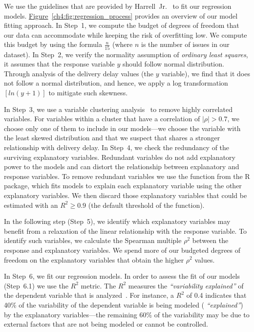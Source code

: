 We use the guidelines that are provided by
Harrell~Jr.~\cite{harrell2001regression} to fit our regression models.
\hyperref[ch4:fig:regression_process]{Figure}~\ref{ch4:fig:regression_process} provides
an overview of our model fitting approach. In Step~1, we compute the budget of
degrees of freedom that our data can accommodate while keeping the risk of
overfitting low. We compute this budget by using the formula $\frac{n}{15}$
(where $n$ is the number of issues in our dataset). In Step~2, we verify the
normality assumption of \textit{ordinary least squares}, \ie it assumes that the
response variable $y$ should follow normal distribution. Through analysis of the
delivery delay values (\ie the $y$ variable), we find that it does not follow
a normal distribution, and hence, we apply a log transformation $[ln(y+1)]$ to
mitigate such skewness.

In Step~3, we use a variable clustering analysis~\cite{sarle1990varclus} to
remove highly correlated variables. For variables within a cluster that have a
correlation of $|\rho|>0.7$, we choose only one of them to include in our
models---we choose the variable with the least skewed distribution and that we
suspect that shares a stronger relationship with delivery delay. In Step~4, we
check the redundancy of the surviving explanatory variables. Redundant variables
do not add explanatory power to the models and can distort the relationship
between explanatory and response variables. To remove redundant variables we use
the  function from the  R package, which fits models to
explain each explanatory variable using the other explanatory variables. We then
discard those explanatory variables that could be estimated with an $R^2 \geq
0.9$ (the default threshold of the  function).

In the following step (Step~5), we identify which explanatory variables may
benefit from a relaxation of the linear relationship with the response variable.
To identify such variables, we calculate the Spearman multiple $\rho^2$ between
the response and explanatory variables. We spend more of our budgeted degrees of
freedom on the explanatory variables that obtain the higher $\rho^2$ values.

In Step~6, we fit our regression models. In order to assess the fit of our
models (Step~6.1) we use the $R^2$ metric. The $R^2$ measures the {\em
``variability explained''} of the dependent variable that is
analyzed~\cite{steel1960principles}. For instance, a $R^2$ of 0.4 indicates that
40\% of the variability of the dependent variable is being modeled ({\em
``explained''}) by the explanatory variables---the remaining 60\% of the
variability may be due to external factors that are not being modeled or cannot
be controlled. 


